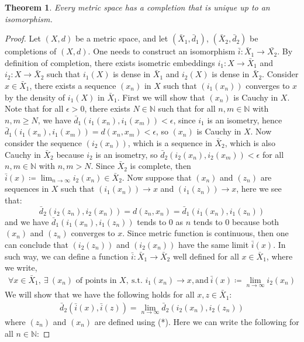 \documentclass[11pt]{book}
\theoremstyle{break}
\theoremstyle{break}
\newtheorem{thm}{Theorem}[section]
\newcommand{\N}{\mathbb{N}}
\begin{document}
\begin{thm}
Every metric space has a completion that is unique up to an isomorphism. 
\end{thm}
\begin{proof}
Let $(X,d)$ be a metric space, and let $(\bar{X}_1,\bar{d}_1)$, $(\bar{X}_2,\bar{d}_2)$ be completions of $(X,d)$. One needs to construct an isomorphism $\bar{i}: \bar{X}_1 \to \bar{X_2}$. By definition of completion, there exists isometric embeddings $i_1: X \to \bar{X}_1$ and $i_2:X \to \bar{X}_2$ such that $i_1(X)$ is dense in $\bar{X}_1$ and $i_2(X)$ is dense in $\bar{X}_2$. Consider $x \in \bar{X}_1$, there exists a sequence $(x_n)$ in $X$ such that $(i_1(x_n))$ converges to $x$ by the density of $i_1(X)$ in $\bar{X}_1$. First we will show that $(x_n)$ is Cauchy in $X$. Note that for all $\epsilon>0$, there exists $N \in \N$ such that for all $n, m \in \N$ with $n,m \geq N$, we have $\bar{d}_1(i_1(x_n),i_1(x_m)) < \epsilon$, since $i_1$ is an isometry, hence $\bar{d}_1(i_1(x_n), i_1(x_m)) = d(x_n,x_m) < \epsilon$, so $(x_n)$ is Cauchy in $X$. Now consider the sequence $(i_2(x_n))$, which is a sequence in $\bar{X}_2$, which is also Cauchy in $\bar{X}_2$ because $i_2$ is an isometry, so $\bar{d}_2(i_2(x_n), i_2(x_m)) < \epsilon$ for all $n,m \in \N$ with $n,m>N$. Since $\bar{X}_2$ is complete, then $ \bar{i}(x) \coloneqq \lim_{n\to \infty} i_2(x_n) \in \bar{X}_2$. Now suppose that $(x_n)$ and $(z_n)$ are sequences in $X$ such that $(i_1(x_n)) \to x$ and $(i_1(z_n)) \to x$, here we see that: 
$$\bar{d}_2(i_2(z_n), i_2(x_n))=d(z_n,x_n) = \bar{d}_1(i_1(x_n),i_1(z_n))$$
and we have $\bar{d}_1(i_1(x_n),i_1(z_n))$ tends to $0$ as $n$ tends to $0$ because both $(x_n)$ and $(z_n)$ converges to $x$. Since metric function is continuous, then one can conclude that $(i_2(z_n))$ and $(i_2(x_n))$ have the same limit $\bar{i}(x)$. In such way, we can define a function $\bar{i}:\bar{X}_1 \to \bar{X}_2$ well defined for all $x \in \bar{X}_1$, where we write,
\begin{align}
\forall x \in \bar{X}_1,\ \exists \ (x_n) \text{ of points in }X, \ \text{s.t. }i_1(x_n) \to x, \text{and}\ \bar{i}(x) \coloneqq \lim_{n\to \infty} i_2(x_n) 
\tag{*}\end{align}
We will show that we have the following holds for all $x,z \in \bar{X}_1$:
\begin{align*}
\bar{d}_2 (\bar{i}(x), \bar{i}(z)) = \lim_{n\to \infty}\bar{d}_2(i_2(x_n), i_2(z_n))
\end{align*}
where $(z_n)$ and $(x_n)$ are defined using (*). Here we can write the following for all $n \in \N$:

\end{proof}
\end{document}
